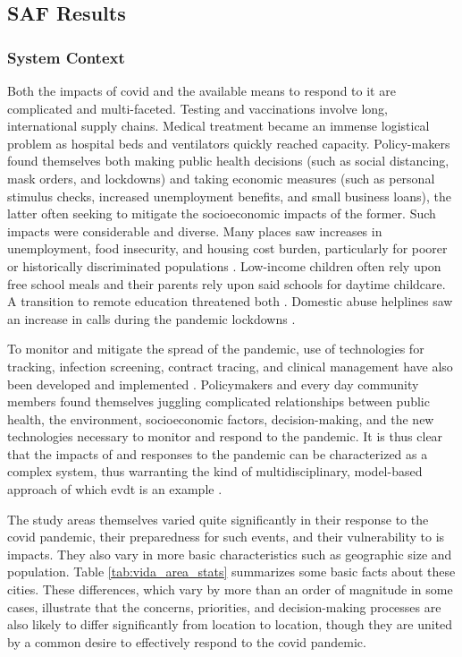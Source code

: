 \subsection{SAF Results} \label{sec:vida-saf-result}

\subsubsection{System Context}

Both the impacts of \ac{covid} and the available means to respond to it are complicated and multi-faceted. Testing and vaccinations involve long, international supply chains. Medical treatment became an immense logistical problem as hospital beds and ventilators quickly reached capacity. Policy-makers found themselves both making public health decisions (such as social distancing, mask orders, and lockdowns) and taking economic measures (such as personal stimulus checks, increased unemployment benefits, and small business loans), the latter often seeking to mitigate the socioeconomic impacts of the former. Such impacts were considerable and diverse. Many places saw increases in unemployment, food insecurity, and housing cost burden, particularly for poorer or historically discriminated populations \cite{melnikGreaterBostonHousing2020}. Low-income children often rely upon free school meals and their parents rely upon said schools for daytime childcare. A transition to remote education threatened both \cite{nicolaSocioeconomicImplicationsCoronavirus2020}. Domestic abuse helplines saw an increase in calls during the pandemic lockdowns \cite{ivandicChangingPatternsDomestic2020}. 

To monitor and mitigate the spread of the pandemic, use of technologies for tracking, infection screening, contract tracing, and clinical management have also been developed and implemented \cite{whitelawApplicationsDigitalTechnology2020}. Policymakers and every day community members found themselves juggling complicated relationships between public health, the environment, socioeconomic factors, decision-making, and the new technologies necessary to monitor and respond to the pandemic. It is thus clear that the impacts of and responses to the pandemic can be characterized as a complex system, thus warranting the kind of multidisciplinary, model-based approach of which \ac{evdt} is an example \cite{deweckHandlingCOVID192020}.

The study areas themselves varied quite significantly in their response to the \ac{covid} pandemic, their preparedness for such events, and their vulnerability to is impacts. They also vary in more basic characteristics such as geographic size and population. Table \ref{tab:vida_area_stats} summarizes some basic facts about these cities. These differences, which vary by more than an order of magnitude in some cases, illustrate that the concerns, priorities, and decision-making processes are also likely to differ significantly from location to location, though they are united by a common desire to effectively respond to the \ac{covid} pandemic.

